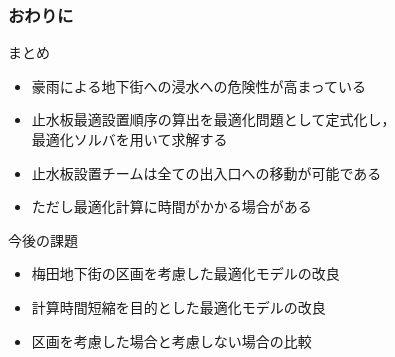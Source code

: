 \documentclass[12pt,dvipdfmx]{beamer}
\begin{document}
    {
      \frametitle{おわりに}

      \begin{beamerboxesrounded}
        {まとめ}
        \begin{itemize}
        \item 豪雨による地下街への浸水への危険性が高まっている
        \item 止水板最適設置順序の算出を最適化問題として定式化し，\\最適化ソルバを用いて求解する
        \item 止水板設置チームは全ての出入口への移動が可能である
        \item ただし最適化計算に時間がかかる場合がある
        \end{itemize}
      \end{beamerboxesrounded}
      \bigskip

      \begin{beamerboxesrounded}
        {今後の課題}
        \begin{itemize}
        \item 梅田地下街の区画を考慮した最適化モデルの改良 
        \item 計算時間短縮を目的とした最適化モデルの改良
        \item 区画を考慮した場合と考慮しない場合の比較
        \end{itemize}
      \end{beamerboxesrounded}

    }

    
    

      
    
\end{document}
